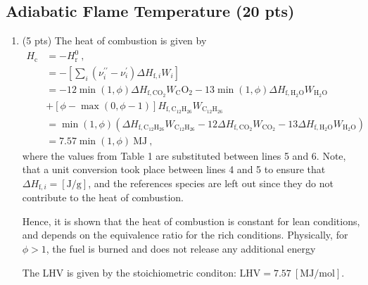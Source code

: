 \documentclass[12pt]{article}
\newcommand{\dod}{\mathrm{C}_{12}\mathrm{H}_{26}}
\newcommand{\wat}{\mathrm{H}_{2}\mathrm{O}}
\newcommand{\cardiox}{\mathrm{C}\mathrm{O}_{2}}
\begin{document}
	\subsection{Adiabatic Flame Temperature (20 pts)}
	\begin{enumerate}[label=(\alph*)]
		\item (5 pts)
		The heat of combustion is given by
			\begin{equation}
				\begin{aligned}
					H_\mathrm{c}&=-H_\mathrm{r}^0\ , \\
					&=-\left[\sum_i(\nu_i^{\prime\prime}-\nu_i^{\prime})\Delta H_{\mathrm{f},i}W_i\right]\\
					&=-12\min(1,\phi)\Delta H_{\mathrm{f},\cardiox}W_\cardiox-13\min(1,\phi)\Delta H_{\mathrm{f},\wat}W_{\wat}\\
					&+[\phi-\max(0,\phi-1)] H_{\mathrm{f},\dod}W_{\dod}\\
					&=\min(1,\phi)\left(\Delta H_{\mathrm{f},\dod}W_{\dod}-12\Delta H_{\mathrm{f},\cardiox}W_{\cardiox}-13\Delta H_{\mathrm{f},\wat}W_{\wat}\right) \\
					&=\boxed{7.57\min(1,\phi)\ \mathrm{MJ}}\ ,
				\end{aligned}
			\end{equation}
		where the values from Table 1 are substituted between lines 5 and 6. Note, that a unit conversion took place between lines 4 and 5 to ensure that $\Delta H_{\mathrm{f},i}=\mathrm{[J/g]}$, and the references species are left out since they do not contribute to the heat of combustion. 
		
		Hence, it is shown that the heat of combustion is constant for lean conditions, and depends on the equivalence ratio for the rich conditions. Physically, for $\phi>1$, the fuel is burned and does not release any additional energy
		
		The LHV is given by the stoichiometric conditon: $\boxed{\mathrm{LHV=7.57\ [MJ/mol]}}$.
		

\end{enumerate}
\end{document}
